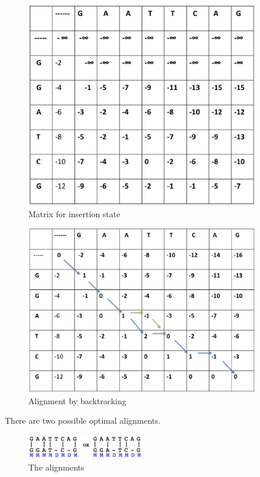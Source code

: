 \documentclass[english, a4paper,11pt]{article}
\begin{document}
\begin{figure}
\begin{centering}
\caption{Matrix for insertion state}
\includegraphics[width=4in]{Slide3}
\par\end{centering}
\end{figure}

\begin{figure}
\begin{centering}
\includegraphics[width=4in]{Slide4}\caption{Alignment by backtracking}
\par\end{centering}
\end{figure}

There are two possible optimal alignments.

\begin{figure}
\begin{centering}
\includegraphics[width=2in]{alignment2.png}
\par\end{centering}
\caption{The alignments}
\end{figure}
\end{document}
